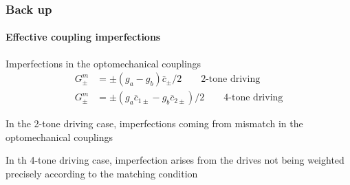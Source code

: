 \documentclass[aspectratio=43]{beamer}
\begin{document}
\begin{frame}
	
	\frametitle{Back up}
	\framesubtitle{Effective coupling imperfections}
	
	Imperfections in the optomechanical couplings
	\begin{align}
		G_{\pm}^{m} &= \pm(g_{a} - g_{b})\bar{c}_{\pm} / 2 \qquad \textrm{2-tone driving} \nonumber\\
		G_{\pm}^{m} &= \pm(g_{a}\bar{c}_{1\pm} - g_{b}\bar{c}_{2\pm}) / 2 \qquad \textrm{4-tone driving} \nonumber
	\end{align}
	
	\vspace{0.5 cm}
	
	In the 2-tone driving case, imperfections coming from mismatch in the optomechanical couplings
	
	\vspace{0.5 cm}
		
	In th 4-tone driving case, imperfection arises from the drives not being weighted precisely according to the matching condition

\end{frame}
\end{document}
